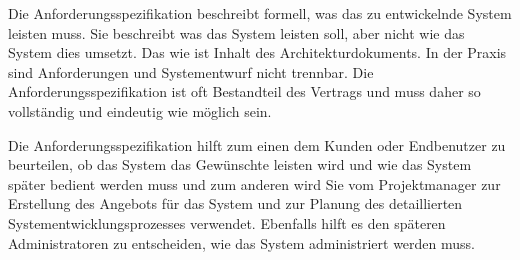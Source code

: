 Die Anforderungsspezifikation beschreibt formell, was das zu entwickelnde System leisten muss. Sie beschreibt was das 
System leisten soll, aber nicht wie das System dies umsetzt. Das wie ist Inhalt des Architekturdokuments. In der Praxis 
sind Anforderungen und Systementwurf nicht trennbar. Die Anforderungsspezifikation ist oft Bestandteil des Vertrags und 
muss daher so vollständig und eindeutig wie möglich sein.

Die Anforderungsspezifikation hilft zum einen dem Kunden oder Endbenutzer zu beurteilen, ob das System das Gewünschte 
leisten wird und wie das System später bedient werden muss und zum anderen wird Sie vom Projektmanager zur Erstellung 
des Angebots für das System und zur Planung des detaillierten Systementwicklungsprozesses verwendet. Ebenfalls hilft es 
den späteren Administratoren zu entscheiden, wie das System administriert werden muss. 